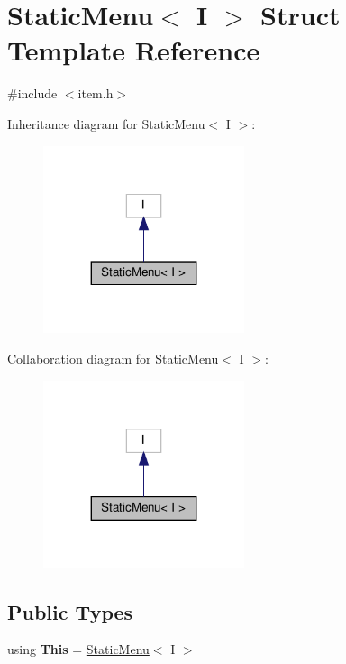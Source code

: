 \hypertarget{structStaticMenu_3_01I_01_4}{}\section{Static\+Menu$<$ I $>$ Struct Template Reference}
\label{structStaticMenu_3_01I_01_4}


{\ttfamily \#include $<$item.\+h$>$}



Inheritance diagram for Static\+Menu$<$ I $>$\+:\nopagebreak
\begin{figure}[H]
\begin{center}
\leavevmode
\includegraphics[width=167pt]{structStaticMenu_3_01I_01_4__inherit__graph}
\end{center}
\end{figure}


Collaboration diagram for Static\+Menu$<$ I $>$\+:\nopagebreak
\begin{figure}[H]
\begin{center}
\leavevmode
\includegraphics[width=167pt]{structStaticMenu_3_01I_01_4__coll__graph}
\end{center}
\end{figure}
\subsection*{Public Types}
\begin{DoxyCompactItemize}
\item 
\mbox{\label{structStaticMenu_3_01I_01_4_add0be905f5b426cf7b9cdec9c21683d3}} 
using {\bfseries This} = \hyperlink{classStaticMenu}{Static\+Menu}$<$ I $>$
\end{DoxyCompactItemize}
